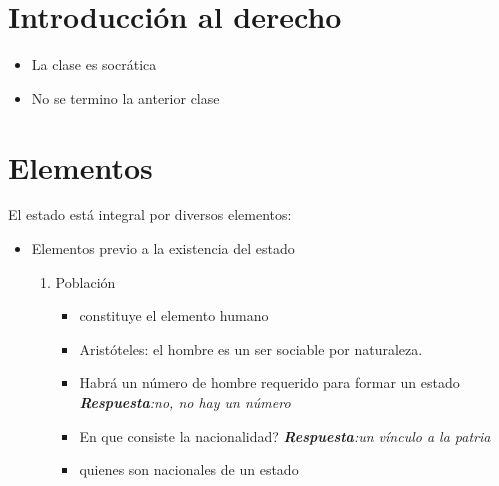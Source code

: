 \section{Introducción al derecho}
\begin{itemize}
    \item La clase es socrática
    \item No se termino la anterior clase
\end{itemize}

\section{Elementos}
El estado está integral por diversos elementos:  \newline 
\begin{itemize}
    \item Elementos previo a la existencia del estado 
    
    
    \begin{enumerate}
        \item Población
        \begin{itemize}
            \item constituye el elemento humano
            \item Aristóteles: el hombre es un ser sociable por naturaleza.
            \item Habrá un número de hombre requerido para formar un estado \emph{\textbf{Respuesta}:no, no hay un número}
            \item En que consiste la nacionalidad? \emph{\textbf{Respuesta}:un vínculo a la patria}
            \item quienes son nacionales de un estado 
            

\end{itemize}
\end{enumerate}
\end{itemize}
